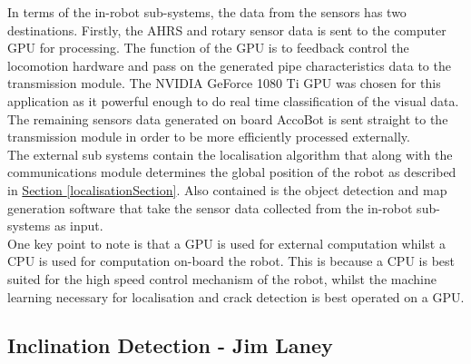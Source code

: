 \documentclass[11pt]{article}		%
\newcommand{\sectref}[1]{\hyperref[#1]{Section \ref*{#1}}}     %
\begin{document}
	        \hspace*{2ex}In terms of the in-robot sub-systems, the data from the sensors has two destinations. Firstly, the AHRS and rotary sensor data is sent to the computer GPU for processing. The function of the GPU is to feedback control the locomotion hardware and pass on the generated pipe characteristics data to the transmission module. The NVIDIA GeForce 1080 Ti GPU was chosen for this application as it powerful enough to do real time classification of the visual data.
	         The remaining sensors data generated on board AccoBot is sent straight to the transmission module in order to be more efficiently processed externally.
	         \\
	        \hspace*{2ex}The external sub systems contain the localisation algorithm that along with the communications module determines the global position of the robot as described in \sectref{localisationSection}. Also contained is the object detection and map generation software that take the sensor data collected from the in-robot sub-systems as input.
	        \\
	        \hspace*{2ex}One key point to note is that a GPU is used for external computation whilst a CPU is used for computation on-board the robot. This is because a CPU is best suited for the high speed control mechanism of the robot, whilst the machine learning necessary for localisation and crack detection is best operated on a GPU.
	          
		\subsection[Inclination Detection]{Inclination Detection - Jim Laney} \label{poseCalculation}
		
\end{document}
